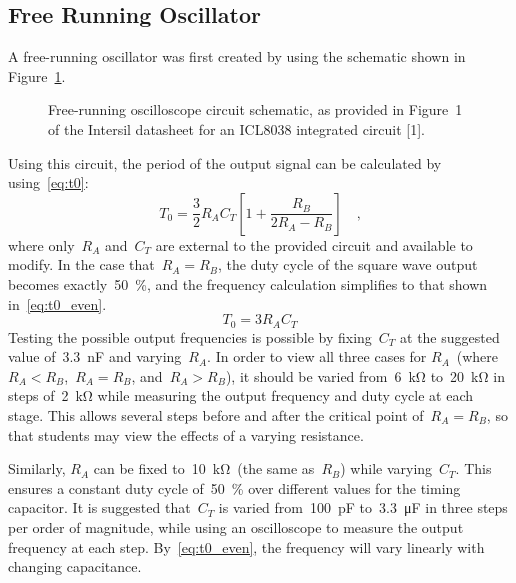 \subsection{Free Running Oscillator}
A free-running oscillator was first created by using the schematic shown in
Figure~\ref{fig:free_run}.
%
\begin{figure}[H]
	\centering
	
	\parbox{.6\textwidth}{
	\caption{Free-running oscilloscope circuit schematic, as provided in Figure~1 of the
	Intersil datasheet for an ICL8038 integrated circuit [1].}
	\label{fig:free_run}}
\end{figure}
%
Using this circuit, the period of the output signal can be calculated by using~\eqref{eq:t0}:
%
\begin{equation}
	T_0 = \frac{3}{2} R_A C_T \left[ 1 + \frac{R_B}{2R_A - R_B} \right] \quad \text{,}
	\label{eq:t0}
\end{equation}
%
where only~$R_A$ and~$C_T$ are external to the provided circuit and available
to modify.  In the case that~$R_A = R_B$, the duty cycle of the square wave
output becomes exactly~\SI{50}{\percent}, and the frequency calculation
simplifies to that shown in~\eqref{eq:t0_even}.
%
\begin{equation}
	T_0 = 3 R_A C_T
	\label{eq:t0_even}
\end{equation}
%
Testing the possible output frequencies is possible by fixing~$C_T$ at the
suggested value of~\SI{3.3}{\nano\farad} and varying~$R_A$.  In order to view
all three cases for $R_A$~(where~$R_A < R_B$,~$R_A = R_B$, and~$R_A > R_B$), it
should be varied from~\SI{6}{\kilo\ohm} to~\SI{20}{\kilo\ohm} in steps
of~\SI{2}{\kilo\ohm} while measuring the output frequency and duty cycle at
each stage.  This allows several steps before and after the critical point
of~$R_A = R_B$, so that students may view the effects of a varying resistance.

Similarly, $R_A$ can be fixed to~\SI{10}{\kilo\ohm}~(the same as~$R_B$) while
varying~$C_T$.  This ensures a constant duty cycle of~\SI{50}{\percent} over
different values for the timing capacitor.  It is suggested that~$C_T$ is
varied from~\SI{100}{\pico\farad} to~\SI{3.3}{\micro\farad} in three steps per
order of magnitude, while using an oscilloscope to measure the output frequency
at each step.  By~\eqref{eq:t0_even}, the frequency will vary linearly with
changing capacitance.

